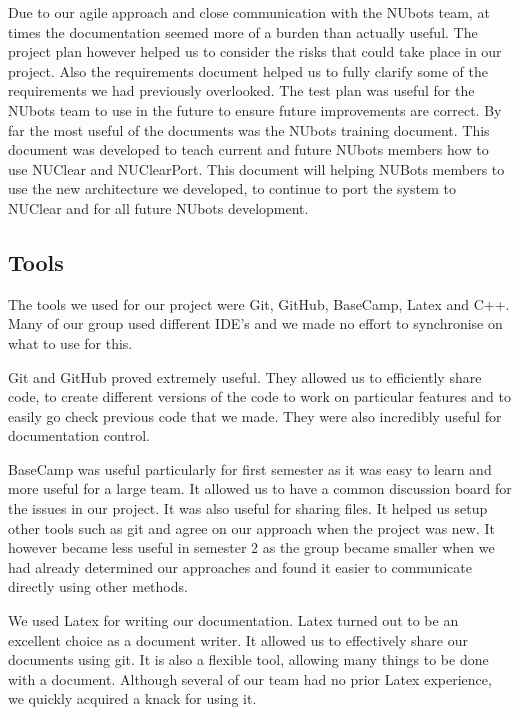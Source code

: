 \documentclass[english,12pt]{scrartcl}
\begin{document}
		Due to our agile approach and close communication with the NUbots team, at times the documentation seemed more of a burden than actually useful. 
		The project plan however helped us to consider the risks that could take place in our project.
		Also the requirements document helped us to fully clarify some of the requirements we had previously overlooked.
		The test plan was useful for the NUbots team to use in the future to ensure future improvements are correct.
		By far the most useful of the documents was the NUbots training document.
		This document was developed to teach current and future NUbots members how to use NUClear and NUClearPort.
		This document will helping NUBots members to use the new architecture we developed, to continue to port the system to NUClear and for all future NUbots development.

	\subsection{Tools}
		The tools we used for our project were Git, GitHub, BaseCamp, Latex and C++.
		Many of our group used different IDE's and we made no effort to synchronise on what to use for this.

		Git and GitHub proved extremely useful.
		They allowed us to efficiently share code, to create different versions of the code to work on particular features and to easily go check previous code that we made. 
		They were also incredibly useful for documentation control.

		BaseCamp was useful particularly for first semester as it was easy to learn and more useful for a large team. 
		It allowed us to have a common discussion board for the issues in our project. It was also useful for sharing files.
		It helped us setup other tools such as git and agree on our approach when the project was new.
		It however became less useful in semester 2 as the group became smaller when we had already determined our approaches and found it easier to communicate directly using other methods.

		We used Latex for writing our documentation. 
		Latex turned out to be an excellent choice as a document writer. 
		It allowed us to effectively share our documents using git.
		It is also a flexible tool, allowing many things to be done with a document.
		Although several of our team had no prior Latex experience, we quickly acquired a knack for using it.
\end{document}
